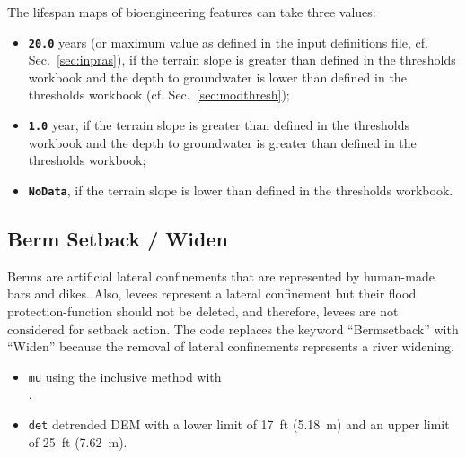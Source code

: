 The lifespan maps of bioengineering features can take three values:
\begin{itemize}
	\item[] \texttt{\textbf{20.0}} years (or maximum value as defined in the input definitions file, cf. Sec.~\ref{sec:inpras}), if the terrain slope is greater than defined in the thresholds workbook and the depth to groundwater is lower than defined in the thresholds workbook (cf. Sec.~\ref{sec:modthresh});
	\item[] \texttt{\textbf{1.0}} year, if the terrain slope is greater than defined in the thresholds workbook and the depth to groundwater is greater than defined in the thresholds workbook;
	\item[] \texttt{\textbf{NoData}}, if the terrain slope is lower than defined in the thresholds workbook.
\end{itemize}


\subsection{Berm Setback / Widen}\label{sec:berms}
Berms are artificial lateral confinements that are represented by human-made bars and dikes. Also, levees represent a lateral confinement but their flood protection-function should not be deleted, and therefore, levees are not considered for setback action. The code replaces the keyword ``Bermsetback'' with ``Widen'' because the removal of lateral confinements represents a river widening.
\begin{itemize}
	\item \texttt{mu} using the inclusive method with \pythoninline{mu_good = ["bank", "floodplain", "high floodplain", "island-"}\\
	\pythoninline{"floodplain", "island high floodplain", "lateral bar", "levee", "spur dike", "terrace"]}.
	\item \texttt{det} detrended DEM with a lower limit of 17~ft (5.18~m) and an upper limit of 25~ft (7.62~m).%
\end{itemize}

